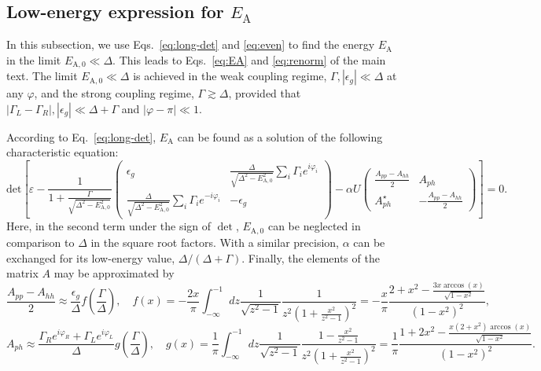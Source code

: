 \documentclass[aps,reprint,longbibliography, prb]{revtex4-2}
\begin{document}
\subsection{Low-energy expression for $E_\mathrm{A}$}
\label{app:int-low-en}
In this subsection, we use Eqs.~\eqref{eq:long-det} and \eqref{eq:even} to find the energy $E_\mathrm{A}$ in the limit $E_{\mathrm{A,0}}\ll \Delta$. This leads to Eqs.~\eqref{eq:EA} and \eqref{eq:renorm} of the main text. 
The limit $E_\mathrm{A,0}\ll \Delta$ is achieved in the weak coupling regime, $\Gamma,|\epsilon_g| \ll \Delta$ at any $\varphi$, and the strong coupling regime, $\Gamma\gtrsim\Delta$, provided that $|\Gamma_L - \Gamma_R|,|\epsilon_g|\ll \Delta + \Gamma$ and $|\varphi-\pi|\ll 1$.

According to Eq.~\eqref{eq:long-det}, $E_\mathrm{A}$ can be found as a solution of the following characteristic equation:
\begin{equation}
    \label{eq:long-long-det}
    \mathrm{det}\left[\varepsilon - 
    \frac{1}{1 + \frac{\Gamma}{\sqrt{\Delta^2 - E_\mathrm{A,0}^2}}}
    \begin{pmatrix}
    \epsilon_g & \frac{\Delta}{\sqrt{\Delta^2 - E_\mathrm{A,0}^2}}\sum_i\Gamma_i e^{i\varphi_i}\\
    \frac{\Delta}{\sqrt{\Delta^2 - E_\mathrm{A,0}^2}}\sum_i\Gamma_i e^{-i\varphi_i} & -\epsilon_g
    \end{pmatrix} - \alpha U
    \begin{pmatrix}
    \frac{A_{pp}-A_{hh}}{2} & A_{ph} \\
    A_{ph}^\star & -\frac{A_{pp}-A_{hh}}{2}
    \end{pmatrix}\right] = 0.
\end{equation}
Here, in the second term under the sign of $\det$,  $E_\mathrm{A,0}$ can be neglected in comparison to $\Delta$ in the square root factors. With a similar precision, $\alpha$ can be exchanged for its low-energy value, $\Delta/(\Delta+\Gamma)$. Finally, the elements of the matrix $A$ may be approximated by
\begin{equation}
\label{eq:f}
    \frac{A_{pp} - A_{hh}}{2} \approx \frac{\epsilon_g}{\Delta}f\left(\frac{\Gamma}{\Delta}\right),\quad f\left(x\right)  = - \frac{2x}{\pi}\int_{-\infty}^{-1}dz\frac{1}{\sqrt{z^{2}-1}}\frac{1}{z^{2}\left(1+\frac{x^{2}}{z^{2}-1}\right)^{2}} = -\frac{x}{\pi} \frac{2+x^2 - \frac{3 x \arccos(x)}{\sqrt{1-x^2}}}{(1-x^2)^2},
\end{equation}
\begin{equation}
\label{eq:g}
    A_{ph} \approx\frac{\Gamma_{R}e^{i\varphi_{R}}+\Gamma_{L}e^{i\varphi_{L}}}{\Delta}g\left(\frac{\Gamma}{\Delta}\right),\quad g(x) = \frac{1}{\pi}\int_{-\infty}^{-1} dz\frac{1}{\sqrt{z^2 - 1}}\frac{1-\frac{x^{2}}{z^{2}-1}}{z^{2}\left(1+\frac{x^{2}}{z^{2}-1}\right)^{2}} = \frac{1}{\pi}\frac{1+2x^2 - \frac{x (2 + x^2)\arccos(x)}{\sqrt{1-x^2}}}{(1-x^2)^2}.
\end{equation}
\end{document}
